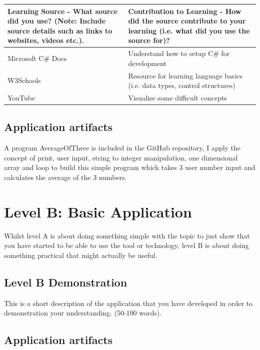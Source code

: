\documentclass[a4paper, 11pt]{report}
\begin{document}
\begin{tabular}{|p{}|p{}|}
	\hline
	Learning Source - What source did you use? (Note: Include source details such as links to websites, videos etc.). & Contribution to Learning - How did the source contribute to your learning (i.e. what did you use the source for)?\\
	\hline
	Microsoft C# Docs & Understand how to setup C# for development\\
	\hline
	 W3Schools & Resource for learning language basics (i.e. data types, control structures)\\
	\hline
	YouTube & Visualise some difficult concepts\\
\end{tabular}

\subsection{Application artifacts}
A program AverageOfThree is included in the GitHub repository, I apply the concept of print, user input, string to integer manipulation, one dimensional array and loop to build this simple program which takes 3 user number input and calculates the average of the 3 numbers.





\newpage
\section{Level B: Basic Application}

Whilst level A is about doing something simple with the topic to just show that you have started to be able to use the tool or technology, level B is about doing something practical that might actually be useful.

\subsection{Level B Demonstration}

This is a short description of the application that you have developed in order to demonstration your understanding. (50-100 words).

\subsection{Application artifacts}
\end{document}
